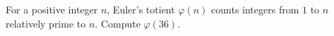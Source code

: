 For a positive integer $n$, Euler's totient $\varphi(n)$ counts integers from $1$ to $n$ relatively prime to $n$. Compute $\varphi(36)$.
